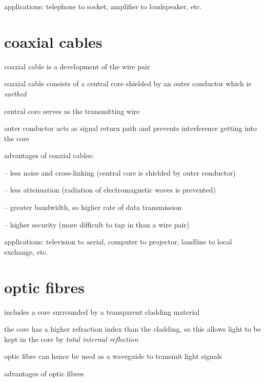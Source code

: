 \cmt applications: telephone to socket, amplifier to loudspeaker, etc.

\section{coaxial cables}

coaxial cable is a development of the wire pair

coaxial cable consists of a central core shielded by an outer conductor which is \emph{earthed}

central core serves as the transmitting wire

outer conductor acts as signal return path and prevents interference getting into the core

\cmt advantages of coaxial cables:

\begin{compactitem}
	\item[--] less noise and cross-linking (central core is shielded by outer conductor)
	
	\item[--] less attenuation (radiation of electromagnetic waves is prevented)
	
	\item[--] greater bandwidth, so higher rate of data transmission
	
	\item[--] higher security (more difficult to tap in than a wire pair)
\end{compactitem}


\cmt applications: television to aerial, computer to projector, landline to local exchange, etc.




\section{optic fibres}

 includes a core surrounded by a transparent cladding material

the core has a higher refraction index than the cladding, so this allows light to be kept in the core by \emph{total internal reflection}

optic fibre can hence be used as a waveguide to transmit light signals

\cmt advantages of optic fibres

